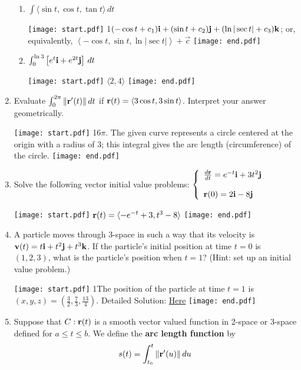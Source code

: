 \documentclass[12pt]{article}
\begin{document}
\begin{enumerate}
\begin{enumerate}
\item $\int \langle \sin{t},\cos{t},\tan{t} \rangle \,dt$

\texttt{[image: start.pdf]}
{{{1\linewidth}{$(-\cos{t}+c_1){\bf i}+(\sin{t}+c_2){\bf j}+(\ln{|\sec{t}|}+c_3){\bf k}$; or, equivalently,
$\left\langle -\cos{t}, \sin{t}, \ln{|\sec{t}|}\right\rangle+\overrightarrow{c}$}}}
\texttt{[image: end.pdf]}


\item $\int_0^{\ln3} \left[e^t{\bf i}+e^{2t}{\bf j}\right] \,dt$

\texttt{[image: start.pdf]}
{{$\langle 2,4 \rangle$}}
\texttt{[image: end.pdf]}


\end{enumerate}

\item  Evaluate $\int_0^{2\pi} \|{\bf r}^{\prime}(t)\| \,dt$ if ${\bf r}(t)=\langle 3\cos{t}, 3\sin{t} \rangle$.  Interpret your answer geometrically.

\texttt{[image: start.pdf]}
{{{1\linewidth}{$6\pi$.  The given curve represents a circle centered at the origin with a radius of 3; this integral gives the arc length (circumference) of the circle.}}}
\texttt{[image: end.pdf]}


\item Solve the following vector initial value problems: $\left\{\begin{array}{l}
\frac{d{\bf r}}{dt}=e^{-t}{\bf i}+3t^2{\bf j}\\
\\
{\bf r}(0)=2{\bf i}-8{\bf j}\end{array}\right.$

\texttt{[image: start.pdf]}
{{${\bf r}(t)=\langle -e^{-t}+3, t^3-8 \rangle$}}
\texttt{[image: end.pdf]}


\item A particle moves through 3-space in such a way that its velocity is ${\bf v}(t)=t{\bf i}+t^2{\bf j}+t^3{\bf k}$.  If the particle's initial position at time $t=0$ is $(1,2,3)$, what is the particle's position when $t=1$? (Hint: set up an initial value problem.)

\texttt{[image: start.pdf]}
{{{1\linewidth}{The position of the particle at time $t=1$ is $(x,y,z)=\left( \frac{3}{2}, \frac{7}{3}, \frac{13}{4}\right)$.  Detailed Solution: \textcolor{blue}{\href{http://www.math.drexel.edu/classes/Calculus/resources/Math200HW/Solutions/08_200_Vector_Functions_14.pdf}{Here}}}}}
\texttt{[image: end.pdf]}


\item Suppose that $C: {\bf r}(t)$ is a smooth vector valued function in 2-space or 3-space defined for $a \leq t \leq b$.  We define the {\bf arc length function} by $$s(t)=\int_{t_0}^t \|{\bf r}^{\prime}(u)\| \,du$$


\end{enumerate}
\end{document}
